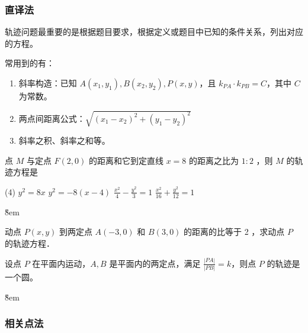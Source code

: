 \subsubsection{直译法}

\begin{definition}
    轨迹问题最重要的是根据题目要求，根据定义或题目中已知的条件关系，列出对应的方程。
\end{definition}

\begin{theorem}
    常用到的有：

    \begin{enumerate}
        \item 斜率构造：已知 $A(x_1,y_1), B(x_2,y_2), P(x,y)$，且 $k_{PA} \cdot k_{PB} = C$，其中 $C$ 为常数。
        \item 两点间距离公式：$\sqrt{(x_1-x_2)^2 + (y_1-y_2)^2}$
        \item 斜率之积、斜率之和等。
    \end{enumerate}
\end{theorem}

\begin{example}
    点 $M$ 与定点 $F(2,0)$ 的距离和它到定直线 $x=8$ 的距离之比为 $1: 2$ ，则 $M$ 的轨迹方程是

    \begin{tasks}(4)
        \task $y^2=8 x$
        \task $y^2=-8(x-4)$
        \task $\frac{x^2}{4}-\frac{y^2}{3}=1$
        \task $\frac{x^2}{16}+\frac{y^2}{12}=1$
    \end{tasks}
\end{example}

\v{8em}

\begin{example}
    动点 $P(x, y)$ 到两定点 $A(-3,0)$ 和 $B(3,0)$ 的距离的比等于 2 ，求动点 $P$ 的轨迹方程．
\end{example}

\begin{theorem}[阿氏圆]
    设点 $P$ 在平面内运动，$A, B$ 是平面内的两定点，满足 $\frac{|PA|}{|PB|} = k$，则点 $P$ 的轨迹是一个圆。
\end{theorem}

\v{8em}

\subsubsection{相关点法}

